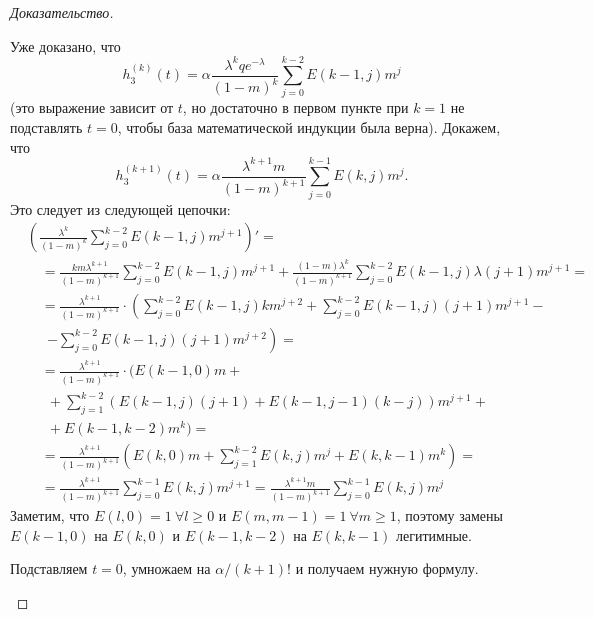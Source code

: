 \documentclass[12pt, specialist, subf, substylefile = spbu_report.rtx]{disser}
\begin{document}
\begin{proof}[Доказательство]
\begin{enumerate}
			Уже доказано, что
			\[
			h _3 ^{(k)} (t) = \alpha \frac {\lambda ^k q e ^{-\lambda}} {(1 - m) ^k} \sum \limits _{j = 0} ^{k - 2} E(k - 1, j) m ^j
			\]
			(это выражение зависит от $t$, но достаточно в первом пункте при $k = 1$ не подставлять $t = 0$, чтобы база математической индукции была верна). Докажем, что
			\[
			h _3 ^{(k + 1)} (t) = \alpha \frac {\lambda ^{k + 1} m} {(1 - m) ^{k + 1}} \sum \limits _{j = 0} ^{k - 1} E(k, j) m ^j.
			\]
			Это следует из следующей цепочки:
			\[
			\begin{aligned}
				&\left(\frac {\lambda ^k} {(1 - m) ^k} \sum \limits _{j = 0} ^{k - 2} E(k - 1, j) m ^{j + 1}\right)' =\\
				&\quad = \frac {km\lambda ^{k + 1}} {(1 - m) ^{k + 1}} \sum \limits _{j = 0} ^{k - 2} E(k - 1, j) m ^{j + 1} + \frac {(1 - m)\lambda ^k} {(1 - m) ^{k + 1}} \sum \limits _{j = 0} ^{k - 2} E(k - 1, j) \lambda (j + 1) m ^{j + 1} =\\
				&\quad = \frac {\lambda ^{k + 1}} {(1 - m) ^{k + 1}} \cdot \left(\sum \limits _{j = 0} ^{k - 2} E(k - 1, j) k m ^{j + 2} + \sum \limits _{j = 0} ^{k - 2} E(k - 1, j) (j + 1) m ^{j + 1} -
				\right.\\
				&\quad~~\left. - \sum \limits _{j = 0} ^{k - 2} E(k - 1, j) (j + 1) m ^{j + 2}\right) =\\
				&\quad = \frac {\lambda ^{k + 1}} {(1 - m) ^{k + 1}} \cdot \Bigg(E(k - 1, 0) m +\\
				&\quad~~ + \sum \limits _{j = 1} ^{k - 2} \left(E(k - 1, j) (j + 1) +E(k - 1, j - 1) (k - j)\right) m ^{j + 1} +\\
				&\quad~~ + E(k - 1, k - 2) m ^k\Bigg) =\\
				&\quad = \frac {\lambda ^{k + 1}} {(1 - m) ^{k + 1}} \left(E(k, 0) m + \sum \limits _{j = 1} ^{k - 2} E(k, j) m ^j + E(k, k - 1) m ^k \right) =\\
				&\quad = \frac {\lambda ^{k + 1}} {(1 - m) ^{k + 1}} \sum \limits _{j = 0} ^{k - 1} E(k, j) m ^{j + 1} = \frac {\lambda ^{k + 1} m} {(1 - m) ^{k + 1}} \sum \limits _{j = 0} ^{k - 1} E(k, j) m ^j
			\end{aligned}
			\]
			Заметим, что $E(l, 0) = 1~ \forall l \geqslant 0$ и $E(m, m - 1) = 1~ \forall m \geqslant 1$, поэтому замены $E(k - 1, 0)$ на $E(k, 0)$ и $E(k - 1, k - 2)$ на $E(k, k - 1)$ легитимные.
			
			Подставляем $t = 0$, умножаем на $\alpha / (k + 1)!$ и получаем нужную формулу.
		\end{enumerate}
	\end{proof}
\end{document}
